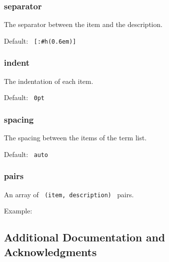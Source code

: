 \begin{Shaded}
\begin{Highlighting}[]
\NormalTok{)}
\end{Highlighting}
\end{Shaded}

\subsubsection{separator}\label{separator}

The separator between the item and the description.

Default: \texttt{\ {[}:\#h(0.6em){]}\ }

\subsubsection{indent}\label{indent}

The indentation of each item.

Default: \texttt{\ 0pt\ }

\subsubsection{spacing}\label{spacing}

The spacing between the items of the term list.

Default: \texttt{\ auto\ }

\subsubsection{pairs}\label{pairs}

An array of \texttt{\ (item,\ description)\ } pairs.

Example:

\begin{Shaded}
\begin{Highlighting}[]
\NormalTok{  (}
\NormalTok{    ([key 1],[description 1]),}
\NormalTok{    ([keyword 2],[description 2]),}
\NormalTok{  )}
\NormalTok{)}
\end{Highlighting}
\end{Shaded}

\subsection{Additional Documentation and
Acknowledgments}\label{additional-documentation-and-acknowledgments}

